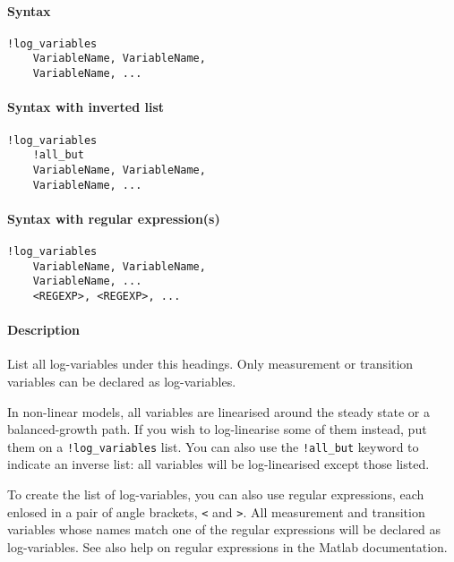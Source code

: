 


	\paragraph{Syntax}\label{syntax}

\begin{verbatim}
!log_variables
    VariableName, VariableName, 
    VariableName, ...
\end{verbatim}

\paragraph{Syntax with inverted list}\label{syntax-with-inverted-list}

\begin{verbatim}
!log_variables
    !all_but
    VariableName, VariableName, 
    VariableName, ...
\end{verbatim}

\paragraph{Syntax with regular
expression(s)}\label{syntax-with-regular-expressions}

\begin{verbatim}
!log_variables
    VariableName, VariableName, 
    VariableName, ...
    <REGEXP>, <REGEXP>, ...
\end{verbatim}

\paragraph{Description}\label{description}

List all log-variables under this headings. Only measurement or
transition variables can be declared as log-variables.

In non-linear models, all variables are linearised around the steady
state or a balanced-growth path. If you wish to log-linearise some of
them instead, put them on a \texttt{!log\_variables} list. You can also
use the \texttt{!all\_but} keyword to indicate an inverse list: all
variables will be log-linearised except those listed.

To create the list of log-variables, you can also use regular
expressions, each enlosed in a pair of angle brackets,
\texttt{\textless{}} and \texttt{\textgreater{}}. All measurement and
transition variables whose names match one of the regular expressions
will be declared as log-variables. See also help on regular expressions
in the Matlab documentation.

